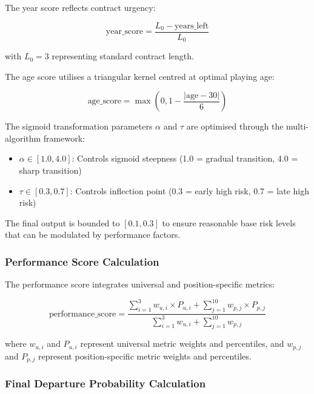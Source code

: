 The year score reflects contract urgency:

\begin{equation}
\text{year\_score} = \frac{L_0 - \text{years\_left}}{L_0}
\end{equation}

with $L_0 = 3$ representing standard contract length.

The age score utilises a triangular kernel centred at optimal playing age:

\begin{equation}
\text{age\_score} = \max\left(0, 1 - \frac{|\text{age} - 30|}{6}\right)
\end{equation}

The sigmoid transformation parameters $\alpha$ and $\tau$ are optimised through the multi-algorithm framework:
\begin{itemize}
    \item $\alpha \in [1.0, 4.0]$: Controls sigmoid steepness (1.0 = gradual transition, 4.0 = sharp transition)
    \item $\tau \in [0.3, 0.7]$: Controls inflection point (0.3 = early high risk, 0.7 = late high risk)
\end{itemize}

The final output is bounded to $[0.1, 0.3]$ to ensure reasonable base risk levels that can be modulated by performance factors.

\subsubsection{Performance Score Calculation}

The performance score integrates universal and position-specific metrics:

\begin{equation}
\text{performance\_score} = \frac{\sum_{i=1}^{3} w_{u,i} \times P_{u,i} + \sum_{j=1}^{10} w_{p,j} \times P_{p,j}}{\sum_{i=1}^{3} w_{u,i} + \sum_{j=1}^{10} w_{p,j}}
\end{equation}

where $w_{u,i}$ and $P_{u,i}$ represent universal metric weights and percentiles, and $w_{p,j}$ and $P_{p,j}$ represent position-specific metric weights and percentiles.

\subsubsection{Final Departure Probability Calculation}

